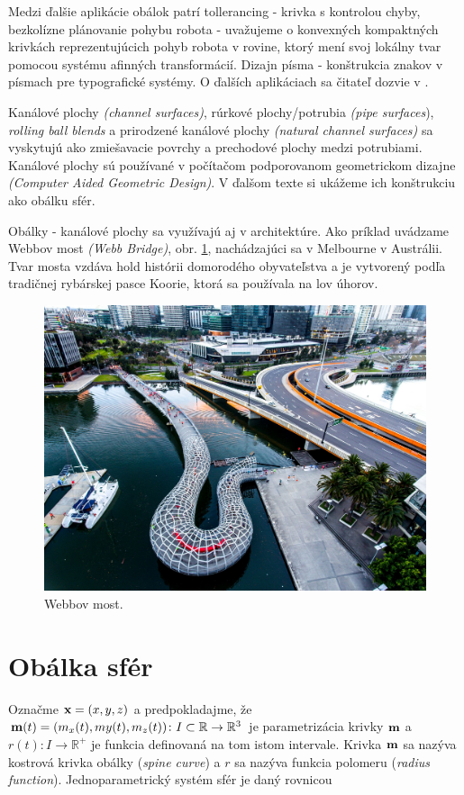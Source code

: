 Medzi ďalšie aplikácie obálok patrí tollerancing - krivka s kontrolou chyby, bezkolízne plánovanie pohybu robota - uvažujeme o konvexných kompaktných krivkách reprezentujúcich pohyb robota v rovine, ktorý mení svoj lokálny tvar pomocou systému afinných transformácií. Dizajn písma - konštrukcia znakov v písmach pre typografické systémy. O ďalších aplikáciach sa čitateľ dozvie v \cite{Pott09}.

Kanálové plochy \textit{(channel surfaces)}, rúrkové plochy/potrubia \textit{(pipe surfaces}), \textit{rolling ball blends} a prirodzené kanálové plochy \textit{(natural channel surfaces)} sa vyskytujú ako zmiešavacie povrchy a prechodové plochy medzi potrubiami. Kanálové plochy sú používané v počítačom podporovanom geometrickom dizajne \textit{(Computer Aided Geometric Design)}. V ďalšom texte si ukážeme ich konštrukciu ako obálku sfér.

Obálky - kanálové plochy sa využívajú aj v architektúre. Ako príklad uvádzame Webbov most \textit{(Webb Bridge)}, obr. \ref{fig:webb_bridge}, nachádzajúci sa v Melbourne v Austrálii. Tvar mosta vzdáva hold histórii domorodého obyvateľstva a je vytvorený podľa tradičnej rybárskej pasce Koorie, ktorá sa používala na lov úhorov.

\begin{figure}[h!]
	\centering
	\includegraphics[width=\textwidth]{images/webb_bridge.jpg}
	\caption{Webbov most.}
	\label{fig:webb_bridge}
\end{figure}

\section{Obálka sfér}
Označme $\bold{x} = (x, y, z)$ a predpokladajme, že $\bold{m}(t) = (m_x(t), my(t), m_z(t)) \colon I \subset \mathbb{R} \rightarrow \mathbb{R}^3$ je parametrizácia krivky $\bold{m}$ a $r(t) \colon I \rightarrow \mathbb{R}^{+}$ je funkcia definovaná na tom istom intervale. Krivka $\bold{m}$ sa nazýva kostrová krivka obálky (\textit{spine curve}) a $r$ sa nazýva funkcia polomeru (\textit{radius function}). Jednoparametrický systém sfér je daný rovnicou


